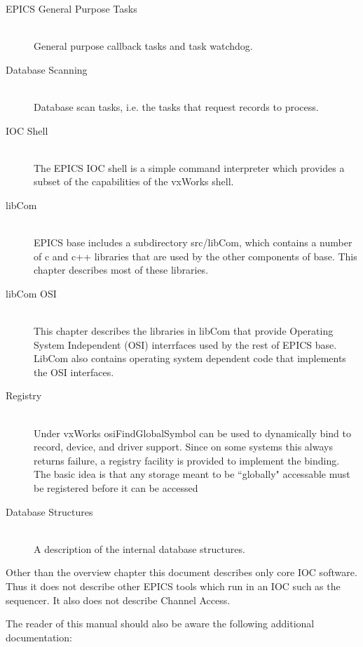 \begin{description}
\item[EPICS General Purpose Tasks] \hfill \\
General purpose callback tasks and  task watchdog.

\item[Database Scanning] \hfill \\
Database scan tasks, i.e. the tasks that request records to process.

\item[IOC Shell] \hfill \\
The EPICS IOC shell is a simple command interpreter which provides a subset of the capabilities of the vxWorks 
shell.

\item[libCom] \hfill \\
EPICS base includes a subdirectory src/libCom, which contains a number of c and c++ libraries that are used by 
the other components of base. This chapter describes most of these libraries.

\item[libCom OSI] \hfill \\
This chapter describes the libraries in libCom that provide Operating System Independent (OSI) interrfaces used 
by the rest of EPICS base. LibCom also contains operating system dependent code that implements the OSI 
interfaces.

\item[Registry] \hfill \\
Under vxWorks osiFindGlobalSymbol can be used to dynamically bind to record, device, and driver support. Since 
on some systems this always returns failure, a registry facility is provided to implement the binding. The basic idea 
is that any storage meant to be ``globally" accessable must be registered before it can be accessed 

\item[Database Structures] \hfill \\
A description of the internal database structures.

\end{description}

Other than the overview chapter this document describes only core IOC software. Thus it does not describe other EPICS 
tools which run in an IOC such as the sequencer. It also does not describe Channel Access. 

The reader of this manual should also be aware the following additional documentation:

